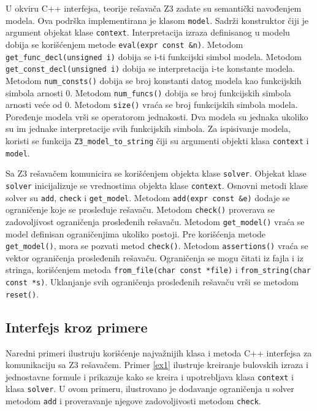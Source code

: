 \documentclass[12pt,oneside]{memoir}
\begin{document}
U okviru C++ interfejsa, teorije rešavača Z3 zadate su semantički navođenjem modela. Ova podrška implementirana je klasom \texttt{model}. Sadrži konstruktor čiji je argument objekat klase \texttt{context}. Interpretacija izraza definisanog u modelu dobija se korišćenjem metode \texttt{eval(expr const \&n)}. Metodom \texttt{get\_func\_decl(unsigned i)} dobija se i-ti funkcijski simbol modela.  
Metodom \texttt{get\_const\_decl(unsigned i)} dobija se interpretacija i-te konstante modela. Metodom \texttt{num\_consts()} dobija se broj konstanti datog modela kao funkcijskih simbola arnosti 0. Metodom \texttt{num\_funcs()} dobija se broj funkcijskih simbola arnosti veće od 0.  Metodom \texttt{size()} vraća se broj funkcijskih simbola modela. Poređenje modela vrši se operatorom jednakosti. Dva modela su jednaka ukoliko su im jednake interpretacije svih funkcijskih simbola. Za ispisivanje modela, koristi se funkcija \texttt{Z3\_model\_to\_string} čiji su argumenti objekti klasa \texttt{context} i \texttt{model}.\par 


Sa Z3 rešavačem komunicira se korišćenjem objekta klase \texttt{solver}. Objekat klase \texttt{solver} inicijalizuje se vrednostima objekta klase \texttt{context}. Osnovni metodi klase solver su \texttt{add}, \texttt{check} i \texttt{get\_model}. Metodom \texttt{add(expr const \&e)} dodaje se ograničenje koje se prosleđuje rešavaču. Metodom \texttt{check()} proverava se zadovoljivost ograničenja prosleđenih rešavaču. Metodom \texttt{get\_model()} vraća se model definisan ograničenjima ukoliko postoji. Pre korišćenja metode \texttt{get\_model()}, mora se pozvati metod \texttt{check()}. Metodom \texttt{assertions()} vraća se vektor ograničenja prosleđenih rešavaču. Ograničenja se mogu čitati iz fajla i iz stringa, korišćenjem metoda \texttt{from\_file(char const *file)} i \texttt{from\_string(char const *s)}. Uklanjanje svih ograničenja prosleđenih rešavaču vrši se metodom \texttt{reset()}. \par

\subsection{Interfejs kroz primere}
Naredni primeri ilustruju korišćenje najvažnijih klasa i metoda C++ interfejsa za komunikaciju sa Z3 rešavačem. Primer \ref{ex1} ilustruje kreiranje bulovskih izraza i jednostavne formule i prikazuje kako se kreira i upotrebljava klasa \texttt{context} i klasa \texttt{solver}. U ovom primeru, ilustrovano je dodavanje ograničenja u solver metodom \texttt{add} i proveravanje njegove zadovoljivosti metodom \texttt{check}. 
\end{document}

